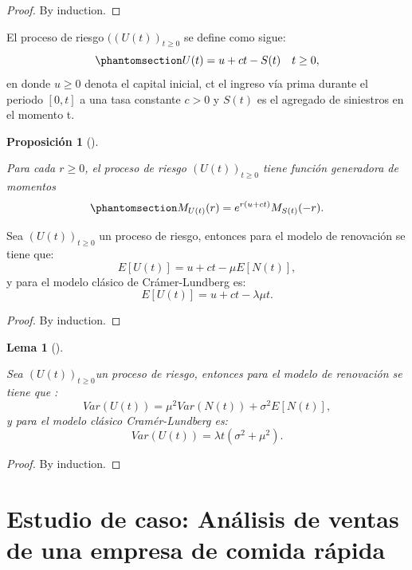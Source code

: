 \documentclass[
  us-letterpaper,
]{scrreprt}
\theoremstyle{definition}
\theoremstyle{plain}
\newtheorem{lemma}{Lema}[chapter]
\theoremstyle{plain}
\newtheorem{proposition}{Proposición}[chapter]
\theoremstyle{remark}
\begin{document}
\begin{proof}
By induction.
\end{proof}

El proceso de riesgo \(((U(t))_{t \geq 0}\) se define como sigue:
\begin{equation}\phantomsection\label{eq-1.7}{U(t) = u + ct - S(t) \ \ \ t\geq 0, }\end{equation}
en donde \(u \geq 0\) denota el capital inicial, ct el ingreso vía prima
durante el periodo \([0,t]\) a una tasa constante \(c > 0\) y \(S(t)\)
es el agregado de siniestros en el momento t.

\begin{proposition}[]\protect\hypertarget{prp-1}{}\label{prp-1}

Para cada \(r\geq0\), el proceso de riesgo \((U(t))_{t\geq0}\) tiene
función generadora de momentos
\begin{equation}\phantomsection\label{eq-1.8}{M_{U(t)}(r) =e^{r(u + ct)} M_{S(t)}(-r).}\end{equation}

\end{proposition}

Sea \((U(t))_{t\geq0}\) un proceso de riesgo, entonces para el modelo de
renovación se tiene que: \[E[U(t)] = u + ct - \mu E[N(t)],\] y para el
modelo clásico de Crámer-Lundberg es:
\[E[U(t)] = u + ct - \lambda \mu t.\]

\begin{proof}
By induction.
\end{proof}

\begin{lemma}[]\protect\hypertarget{lem-4}{}\label{lem-4}

Sea \((U(t))_{t\geq0}\)un proceso de riesgo, entonces para el modelo de
renovación se tiene que :
\[ Var(U(t)) = \mu^2 Var(N(t)) + \sigma^2 E[N(t)],\] y para el modelo
clásico Cramér-Lundberg es: \[Var(U(t)) = \lambda t(\sigma^2 + \mu^2).\]

\end{lemma}

\begin{proof}
By induction.
\end{proof}


\chapter{Estudio de caso: Análisis de ventas de una empresa de comida
rápida}\label{estudio-de-caso-anuxe1lisis-de-ventas-de-una-empresa-de-comida-ruxe1pida}
\end{document}
